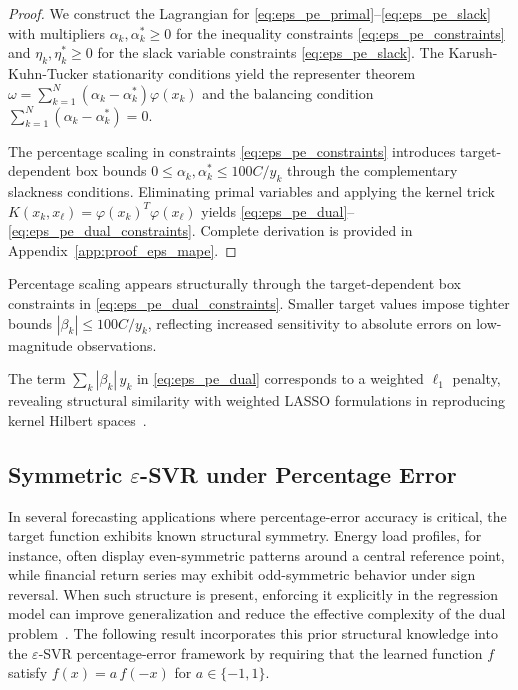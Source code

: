 \documentclass[mathematics,article,submit,pdftex,moreauthors]{Definitions/mdpi}
\begin{document}
\begin{proof}
We construct the Lagrangian for \eqref{eq:eps_pe_primal}--\eqref{eq:eps_pe_slack} 
with multipliers $\alpha_k, \alpha_k^* \geq 0$ for the inequality constraints \eqref{eq:eps_pe_constraints} 
and $\eta_k, \eta_k^* \geq 0$ for the slack variable constraints \eqref{eq:eps_pe_slack}. 
The Karush-Kuhn-Tucker stationarity conditions yield the representer theorem 
$\omega = \sum_{k=1}^N (\alpha_k - \alpha_k^*)\varphi(x_k)$ and the balancing 
condition $\sum_{k=1}^N (\alpha_k - \alpha_k^*) = 0$. 

The percentage scaling in constraints \eqref{eq:eps_pe_constraints} 
introduces target-dependent box bounds $0 \leq \alpha_k, \alpha_k^* \leq 100C/y_k$ through 
the complementary slackness conditions. Eliminating primal variables and applying the 
kernel trick $K(x_k, x_\ell) = \varphi(x_k)^T\varphi(x_\ell)$ yields 
\eqref{eq:eps_pe_dual}--\eqref{eq:eps_pe_dual_constraints}. 
Complete derivation is provided in Appendix~\ref{app:proof_eps_mape}.
\end{proof}

\begin{Remark}\label{rem:eps_percent_effect}
Percentage scaling appears structurally through the target-dependent box constraints in \eqref{eq:eps_pe_dual_constraints}. 
Smaller target values impose tighter bounds $|\beta_k| \leq 100C/y_k$, reflecting increased sensitivity to absolute errors on low-magnitude observations.
\end{Remark}

\begin{Remark}\label{rem:eps_l1_structure}
The term $\sum_k |\beta_k|\,y_k$ in \eqref{eq:eps_pe_dual} corresponds to a weighted $\ell_1$ penalty, 
revealing structural similarity with weighted LASSO formulations in reproducing kernel Hilbert spaces~\cite{Scholkopf2002}.
\end{Remark}


\subsection{Symmetric $\varepsilon$-SVR under Percentage Error}\label{subsec:eps_sym_pe}

In several forecasting applications where percentage-error accuracy is critical,
the target function exhibits known structural symmetry. Energy load profiles,
for instance, often display even-symmetric patterns around a central reference
point, while financial return series may exhibit odd-symmetric behavior under
sign reversal. When such structure is present, enforcing it explicitly in the
regression model can improve generalization and reduce the effective complexity
of the dual problem~\cite{Espinoza2005,Espinoza2006}.
The following result incorporates this prior structural knowledge into the
$\varepsilon$-SVR percentage-error framework by requiring that the learned
function $f$ satisfy $f(x) = a\,f(-x)$ for $a \in \{-1, 1\}$.
\end{document}
